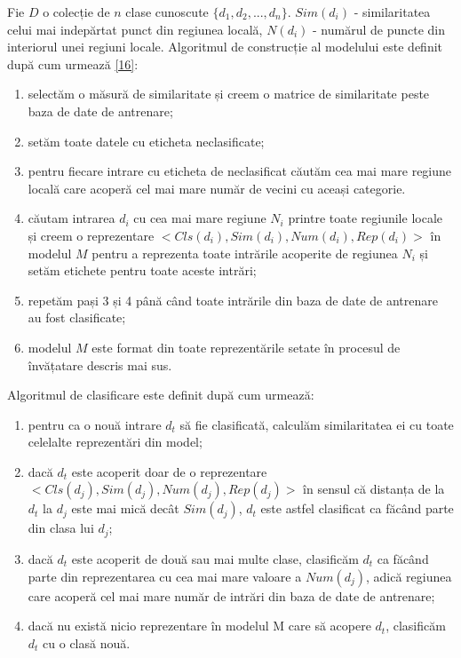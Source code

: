 \vspace{5mm}
Fie $D$ o colecție de $n$ clase cunoscute $\{d_1, d_2,..., d_n\}$. $Sim(d_i)$ - similaritatea celui mai indepărtat punct din regiunea locală, $N(d_i)$ - numărul de puncte din interiorul unei regiuni locale. Algoritmul de construcție al modelului este definit după cum urmează \hyperlink{gongdeguo}{[16]}:
\begin{enumerate}
	\item selectăm o măsură de similaritate și creem o matrice de similaritate peste baza de date de antrenare;
	\item setăm toate datele cu eticheta neclasificate;
	\item pentru fiecare intrare cu eticheta de neclasificat căutăm cea mai mare regiune locală care acoperă cel mai mare număr de vecini cu aceași categorie.
	\item căutam intrarea $d_i$ cu cea mai mare regiune $N_i$ printre toate regiunile locale și creem o reprezentare $<Cls(d_i), Sim(d_i), Num(d_i), Rep(d_i)>$ în modelul $M$ pentru a reprezenta toate intrările acoperite de regiunea $N_i$ și setăm etichete pentru toate aceste intrări;
	\item repetăm pași 3 și 4 până când toate intrările din baza de date de antrenare au fost clasificate;
	\item modelul $M$ este format din toate reprezentările setate în procesul de învățatare descris mai sus.
\end{enumerate}

Algoritmul de clasificare este definit după cum urmează:
\begin{enumerate}
	\item pentru ca o nouă intrare $d_t$ să fie clasificată, calculăm similaritatea ei cu toate celelalte reprezentări din model;
	\item dacă $d_t$ este acoperit doar de o reprezentare $<Cls(d_j), Sim(d_j), Num(d_j), Rep(d_j)>$ în sensul că distanța de la $d_t$ la $d_j$ este mai mică decât $Sim(d_j)$, $d_t$ este astfel clasificat ca făcând parte din clasa lui $d_j$;
	\item dacă $d_t$ este acoperit de două sau mai multe clase, clasificăm $d_t$ ca făcând parte din reprezentarea cu cea mai mare valoare a $Num(d_j)$, adică regiunea care acoperă cel mai mare număr de intrări din baza de date de antrenare;
	\item dacă nu există nicio reprezentare în modelul M care să acopere $d_t$, clasificăm $d_t$ cu o clasă nouă.
\end{enumerate}

